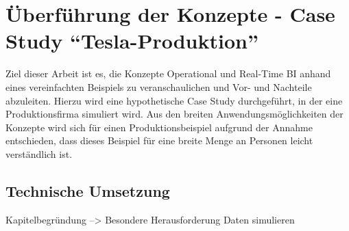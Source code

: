 \chapter{Überführung der Konzepte - Case Study \enquote{Tesla-Produktion}}
Ziel dieser Arbeit ist es, die Konzepte Operational und Real-Time \ac{BI} anhand eines vereinfachten Beispiels zu veranschaulichen und Vor- und Nachteile abzuleiten. Hierzu wird eine hypothetische Case Study durchgeführt, in der eine Produktionsfirma simuliert wird. Aus den breiten Anwendungsmöglichkeiten der Konzepte wird sich für einen Produktionsbeispiel aufgrund der Annahme entschieden, dass dieses Beispiel für eine breite Menge an Personen leicht verständlich ist.
\section{Technische Umsetzung}
Kapitelbegründung --> Besondere Herausforderung Daten simulieren
